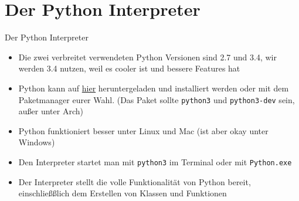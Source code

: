 \section{Der Python Interpreter}
\begin{frame}{Der Python Interpreter}
	\begin{itemize}
    	\item Die zwei verbreitet verwendeten Python Versionen sind 2.7 und 3.4, wir werden 3.4 nutzen, weil es cooler ist und bessere Features hat
    	\item Python kann auf \href{http://www.python.org}{hier} heruntergeladen und installiert werden oder mit dem Paketmanager eurer Wahl. (Das Paket sollte \texttt{python3} und \texttt{python3-dev} sein, au\ss{}er unter Arch)
    	\item Python funktioniert besser unter Linux und Mac (ist aber okay unter Windows)
    	\item Den Interpreter startet man mit \texttt{python3} im Terminal oder mit \texttt{Python.exe}
    	\item Der Interpreter stellt die volle Funktionalität von Python bereit, einschließ\ss{}lich dem Erstellen von Klassen und Funktionen
	\end{itemize}
\end{frame}

